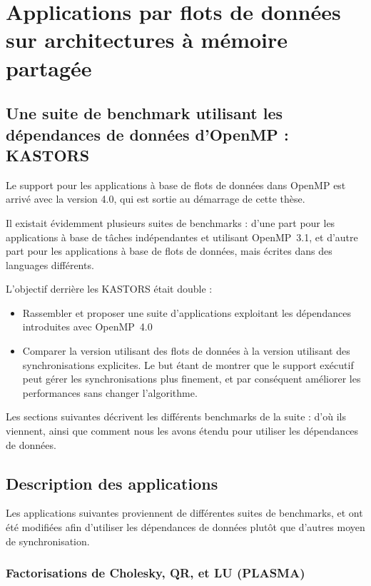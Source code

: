 \section{Applications par flots de données sur architectures à mémoire partagée}


\subsection{Une suite de benchmark utilisant les dépendances de données d'OpenMP : KASTORS}

Le support pour les applications à base de flots de données dans OpenMP est arrivé avec la version 4.0, qui est sortie au démarrage de cette thèse.

Il existait évidemment plusieurs suites de benchmarks : d'une part pour les applications à base de tâches indépendantes et utilisant OpenMP~3.1, et d'autre part pour les applications à base de flots de données, mais écrites dans des languages différents.

L'objectif derrière les KASTORS était double :
\begin{itemize}
    \item Rassembler et proposer une suite d'applications exploitant les dépendances introduites avec OpenMP~4.0
    \item Comparer la version utilisant des flots de données à la version utilisant des synchronisations explicites. Le but étant de montrer que le support exécutif peut gérer les synchronisations plus finement, et par conséquent améliorer les performances sans changer l'algorithme.
\end{itemize}

Les sections suivantes décrivent les différents benchmarks de la suite : d'où ils viennent, ainsi que comment nous les avons étendu pour utiliser les dépendances de données.

\subsection{Description des applications}

Les applications suivantes proviennent de différentes suites de benchmarks, et ont été modifiées afin d'utiliser les dépendances de données plutôt que d'autres moyen de synchronisation.

\subsubsection{Factorisations de Cholesky, QR, et LU (PLASMA)}

